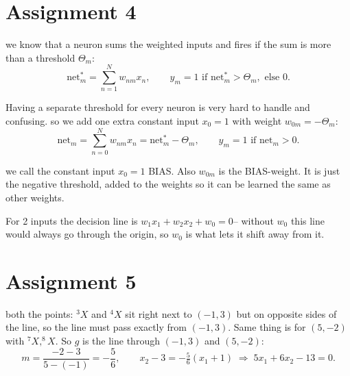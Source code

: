 \documentclass[11pt,a4paper]{article}
\begin{document}
\section*{Assignment 4}

we know that a neuron sums the weighted inputs and fires if the sum is more than a threshold
$\Theta_m$:
\[
  \mathrm{net}^{*}_m = \sum_{n=1}^{N} w_{nm}x_n, \qquad
  y_m = 1 \text{ if } \mathrm{net}^{*}_m > \Theta_m, \text{ else } 0.
\]

Having a separate threshold for every neuron is very hard to handle and confusing. so we add one extra constant input $x_0=1$ with weight
$w_{0m}=-\Theta_m$:
\[
  \mathrm{net}_m = \sum_{n=0}^{N} w_{nm}x_n = \mathrm{net}^{*}_m - \Theta_m,
  \qquad y_m = 1 \text{ if } \mathrm{net}_m > 0.
\]

we call the constant input $x_0=1$ BIAS. Also $w_{0m}$ is the
BIAS-weight. It is just the negative threshold, added to the weights so it
can be learned the same as other weights.

For 2 inputs the decision line is $w_1x_1+w_2x_2+w_0=0$-- without $w_0$ this line would always go
through the origin, so $w_0$ is what lets it shift away from it.

\begin{center}
\end{center}

\section*{Assignment 5}

both the points: $^3X$ and
$^4X$ sit right next to $(-1,3)$ but on opposite
sides of the line, so the line must pass exactly from $(-1,3)$. Same thing is for
$(5,-2)$ with $^7X,^8X$. So $g$ is the line through $(-1,3)$ and $(5,-2)$:
\[
  m=\frac{-2-3}{5-(-1)}=-\frac{5}{6}, \qquad
  x_2-3=-\tfrac56(x_1+1) \;\Rightarrow\; 5x_1+6x_2-13=0.
\]
\end{document}
